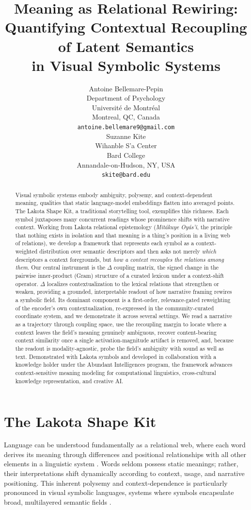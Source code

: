 \documentclass[final,creativeai]{article}
\title{Meaning as Relational Rewiring:\\Quantifying Contextual Recoupling of Latent Semantics\\in Visual Symbolic Systems}
\author{%
  Antoine Bellemare-Pepin \\
  Department of Psychology \\
  Université de Montréal \\
  Montreal, QC, Canada \\
  \texttt{antoine.bellemare9@gmail.com} \\
  \And
  Suzanne Kite \\
  Wihanble S'a Center \\
  Bard College \\
  Annandale-on-Hudson, NY, USA \\
  \texttt{skite@bard.edu} \\
}
\begin{document}
\maketitle

\begin{abstract}
Visual symbolic systems embody ambiguity, polysemy, and context-dependent meaning, qualities that static language-model embeddings flatten into averaged points. The Lakota Shape Kit, a traditional storytelling tool, exemplifies this richness. Each symbol juxtaposes many concurrent readings whose prominence shifts with narrative context. Working from Lakota relational epistemology (\emph{Mitákuye Oyás'i}, the principle that nothing exists in isolation and that meaning is a thing's position in a living web of relations), we develop a framework that represents each symbol as a context-weighted distribution over semantic descriptors and then asks not merely \emph{which} descriptors a context foregrounds, but \emph{how a context recouples the relations among them}. Our central instrument is the $\Delta$ coupling matrix, the signed change in the pairwise inner-product (Gram) structure of a curated lexicon under a context-shift operator. $\Delta$ localizes contextualization to the lexical relations that strengthen or weaken, providing a grounded, interpretable readout of how narrative framing rewires a symbolic field. Its dominant component is a first-order, relevance-gated reweighting of the encoder's own contextualization, re-expressed in the community-curated coordinate system, and we demonstrate it across several settings. We read a narrative as a trajectory through coupling space, use the recoupling margin to locate where a context leaves the field's meaning genuinely ambiguous, recover content-bearing context similarity once a single activation-magnitude artifact is removed, and, because the readout is modality-agnostic, probe the field's ambiguity with sound as well as text. Demonstrated with Lakota symbols and developed in collaboration with a knowledge holder under the Abundant Intelligences program, the framework advances context-sensitive meaning modeling for computational linguistics, cross-cultural knowledge representation, and creative AI.
\end{abstract}

\section{The Lakota Shape Kit}
Language can be understood fundamentally as a relational web, where each word derives its meaning through differences and positional relationships with all other elements in a linguistic system \cite{stawarska_saussures_2020, wood_derrida_1988}. Words seldom possess static meanings; rather, their interpretations shift dynamically according to context, usage, and narrative positioning. This inherent polysemy and context-dependence is particularly pronounced in visual symbolic languages, systems where symbols encapsulate broad, multilayered semantic fields \citep{saint-martin_semiotics_1990}.
\end{document}
